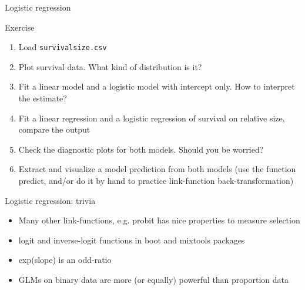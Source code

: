 \documentclass[10pt]{beamer}\usepackage[]{graphicx}\usepackage[]{color}
\begin{document}
\begin{frame}[fragile]{Logistic regression}
  




  \begin{exampleblock}{Exercise}
    \begin{enumerate}
      \item Load \texttt{survivalsize.csv}
      \item Plot survival data. What kind of distribution is it?
      \item Fit a linear model and a logistic model with intercept only. How to interpret the estimate?
      \item Fit a linear regression and a logistic regression of survival on relative size, compare the output
      \item Check the diagnostic plots for both models. Should you be worried?
      \item Extract and visualize a model prediction from both models (use the function predict, and/or do it by hand to practice link-function back-transformation)
    \end{enumerate}
  \end{exampleblock}


\end{frame}

\begin{frame}{Logistic regression: trivia}

  \begin{itemize}[<+->]
    \item Many other link-functions, e.g. probit has nice properties to measure selection
    \item logit and inverse-logit functions in boot and mixtools packages
    \item exp(slope) is an odd-ratio 
    \item GLMs on binary data are more (or equally) powerful than proportion data
  \end{itemize}
\end{frame}
\end{document}
